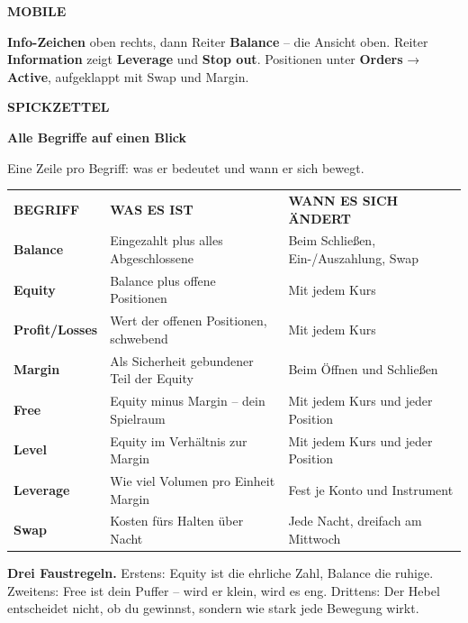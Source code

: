 \documentclass[10pt,a4paper]{article}
\newcommand{\hone}{\fontsize{19}{23}\selectfont\bfseries}
\newcommand{\htwo}{\fontsize{8}{11}\selectfont\bfseries}
\newcommand{\leadf}{\light\fontsize{11.5}{17}\selectfont}
\newcommand{\micro}{\fontsize{7}{9}\selectfont}
\newcommand{\ls}{\addfontfeatures{LetterSpace=14}}
\newcommand{\kicker}[2]{{\htwo\ls\color{muted}\MakeUppercase{#2}\par}%
  \vspace{2mm}{\color{rule}\rule{\linewidth}{0.4pt}}\par\vspace{5.5mm}}
\newcommand{\Hone}[1]{{\hone\color{ink}#1\par}\vspace{3.5mm}}
\newcommand{\lead}[1]{{\leadf\color{body}\raggedright #1\par}}
\newcommand{\hd}[1]{{\micro\bfseries\ls\color{soft}\MakeUppercase{#1}}}
\begin{document}
\begin{minipage}[t]{82mm}\vspace{0pt}\begin{soft}
{\htwo\ls\color{muted}MOBILE}\par\vspace{2.5mm}
{\color{body}\textbf{Info-Zeichen} oben rechts, dann Reiter \textbf{Balance} – die Ansicht oben.
Reiter \textbf{Information} zeigt \textbf{Leverage} und \textbf{Stop out}. Positionen unter
\textbf{Orders} → \textbf{Active}, aufgeklappt mit Swap und Margin.}\end{soft}\end{minipage}
\clearpage
\kicker{}{Spickzettel}
\Hone{Alle Begriffe auf einen Blick}
\begin{minipage}{130mm}\lead{Eine Zeile pro Begriff: was er bedeutet und wann er sich bewegt.}\end{minipage}
\par\vspace{9mm}
\begin{tabular}{@{}p{28mm}p{72mm}p{62mm}@{}}
\hd{Begriff} & \hd{Was es ist} & \hd{Wann es sich ändert} \\
\addlinespace[1.6mm]\midrule\addlinespace[2.4mm]
\textbf{Balance} & Eingezahlt plus alles Abgeschlossene & Beim Schließen, Ein-/Auszahlung, Swap \\ \addlinespace[2mm]
\textbf{Equity} & Balance plus offene Positionen & Mit jedem Kurs \\ \addlinespace[2mm]
\textbf{Profit/Losses} & Wert der offenen Positionen, schwebend & Mit jedem Kurs \\ \addlinespace[2mm]
\textbf{Margin} & Als Sicherheit gebundener Teil der Equity & Beim Öffnen und Schließen \\ \addlinespace[2mm]
\textbf{Free} & Equity minus Margin – dein Spielraum & Mit jedem Kurs und jeder Position \\ \addlinespace[2mm]
\textbf{Level} & Equity im Verhältnis zur Margin & Mit jedem Kurs und jeder Position \\ \addlinespace[2mm]
\textbf{Leverage} & Wie viel Volumen pro Einheit Margin & Fest je Konto und Instrument \\ \addlinespace[2mm]
\textbf{Swap} & Kosten fürs Halten über Nacht & Jede Nacht, dreifach am Mittwoch \\
\end{tabular}
\par\vspace{6mm}
\begin{merk}\textbf{Drei Faustregeln.} Erstens: Equity ist die ehrliche Zahl, Balance die ruhige. Zweitens: Free ist
dein Puffer – wird er klein, wird es eng. Drittens: Der Hebel entscheidet nicht, ob du gewinnst, sondern wie stark
jede Bewegung wirkt.\end{merk}
\end{document}
